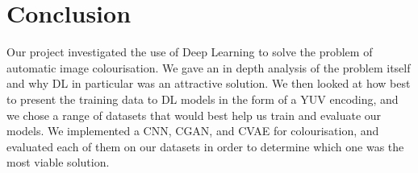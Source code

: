 \documentclass{l4proj}
\begin{document}




\chapter{Conclusion}    

Our project investigated the use of Deep Learning to solve the problem of automatic image colourisation. We gave an in depth analysis of the problem itself and why DL in particular was an attractive solution. We then looked at how best to present the training data to DL models in the form of a YUV encoding, and we chose a range of datasets that would best help us train and evaluate our models. We implemented a CNN, CGAN, and CVAE for colourisation, and evaluated each of them on our datasets in order to determine which one was the most viable solution. 
\end{document}

